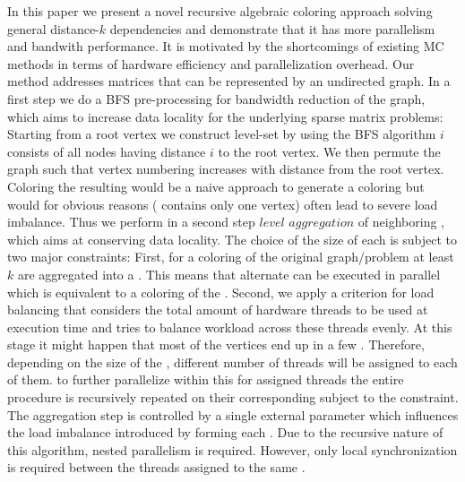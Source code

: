 In this paper we present a novel recursive algebraic coloring approach solving general distance-$k$ dependencies and demonstrate that it has more parallelism and bandwith performance. It is motivated by the shortcomings of existing \acrshort{MC} methods in terms of hardware efficiency and parallelization overhead. Our method addresses matrices that can be represented by an undirected graph. In a first step we do a \acrshort{BFS} pre-processing for bandwidth reduction of the graph, which aims to increase data locality for the underlying sparse matrix problems: Starting from a root vertex we construct level-set by using the \acrshort{BFS} algorithm \ie \level $i$ consists of all nodes having distance $i$ to the root vertex. We then permute the graph such that vertex numbering increases with distance from the root vertex. Coloring the resulting \levels would be a naive approach to generate a \DK coloring but would for obvious reasons (\eg {} contains only one vertex) often lead to severe load imbalance. Thus we perform in a second step $level$ $aggregation$ of neighboring \levels, which aims at conserving data locality. The choice of the size of each \levelGroup is subject to two major constraints: First, for a \DK coloring of the original graph/problem at least $k$ \levels are aggregated into a \levelGroup. This means that alternate \levelGroups can be executed in parallel which is equivalent to a \DONE coloring of the \levelGroups. Second, we apply a criterion for load balancing that considers the total amount of hardware threads to be used at execution time and tries to balance workload across these threads evenly. At this stage it might happen that most of the vertices end up in a few \levelGroups. Therefore, depending on the size of the \levelGroups, different number of threads will be assigned to each of them. \Inorder to further parallelize within this \levelGroup for assigned threads the entire procedure is recursively repeated on their corresponding \subgraphs subject to the \DK constraint. The aggregation step is controlled by a single external parameter which influences the load imbalance introduced by forming each \levelGroup. Due to the recursive nature of this algorithm, nested parallelism is required. However, only local synchronization is required between the threads assigned to the same \subgraph.


